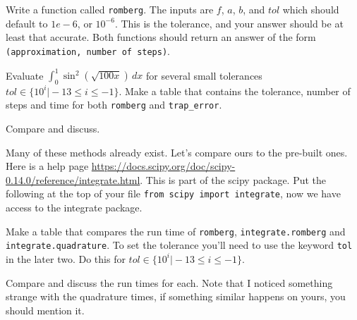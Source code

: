 \documentclass[11pt,letterpaper]{article}
\begin{document}
\begin{problem}
Write a function called \texttt{romberg}. The inputs are $f$, $a$, $b$, and $tol$ which should 
default to $1e-6$, or $10^{-6}$. This is the tolerance, and your answer should be at least that 
accurate. Both functions should return an answer of the form \texttt{(approximation, number of steps)}.

Evaluate $\int_0^1 \sin^2(\sqrt{100x})\,dx$ for several small tolerances 
$tol\in\{10^i\vert -13\le i\le -1\}$. Make a table that contains the tolerance, number of steps
and time for both \texttt{romberg} and \texttt{trap\_error}.

Compare and discuss.
\end{problem}



\begin{problem}
Many of these methods already exist. Let's compare ours to the pre-built ones. Here is a help page
\url{https://docs.scipy.org/doc/scipy-0.14.0/reference/integrate.html}. This is part of the
scipy package. Put the following at the top of your file \texttt{from scipy import integrate}, now
we have access to the integrate package.

Make a table that compares the run time of \texttt{romberg}, \texttt{integrate.romberg} and 
\texttt{integrate.quadrature}. To set the tolerance you'll need to use the keyword \texttt{tol}
in the later two. Do this for $tol\in\{10^i\vert -13\le i\le -1\}$.

Compare and discuss the run times for each. Note that I noticed something strange with the quadrature
times, if something similar happens on yours, you should mention it.

\end{problem}
\end{document}
